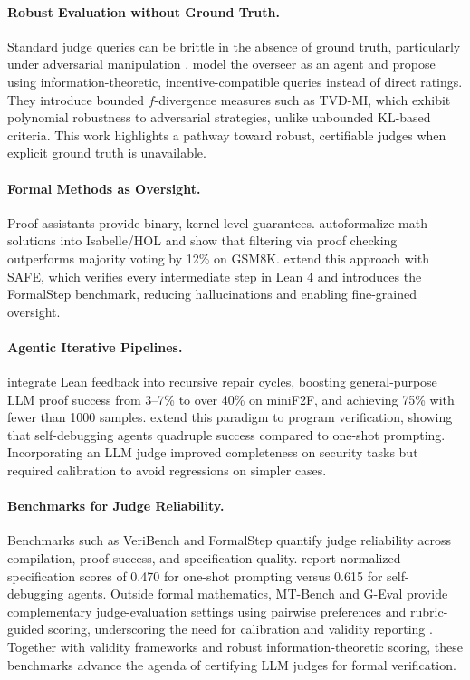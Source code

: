 \documentclass{article}
\begin{document}
\paragraph{Robust Evaluation without Ground Truth.}
Standard judge queries can be brittle in the absence of ground truth, particularly under adversarial manipulation \citep{Zhuo2024ICEScore,TongZhang2024CodeJudge}. \citet{robertson2025stepbystep} model the overseer as an agent and propose using information-theoretic, incentive-compatible queries instead of direct ratings. They introduce bounded $f$-divergence measures such as TVD-MI, which exhibit polynomial robustness to adversarial strategies, unlike unbounded KL-based criteria. This work highlights a pathway toward robust, certifiable judges when explicit ground truth is unavailable.

\paragraph{Formal Methods as Oversight.}
Proof assistants provide binary, kernel-level guarantees. \citet{zhou2024donttrustverify} autoformalize math solutions into Isabelle/HOL and show that filtering via proof checking outperforms majority voting by 12\% on GSM8K. \citet{liu2025safe} extend this approach with SAFE, which verifies every intermediate step in Lean 4 and introduces the FormalStep benchmark, reducing hallucinations and enabling fine-grained oversight.

\paragraph{Agentic Iterative Pipelines.}
\citet{ospanov2023apollo} integrate Lean feedback into recursive repair cycles, boosting general-purpose LLM proof success from 3--7\% to over 40\% on miniF2F, and achieving 75\% with fewer than 1000 samples. \citet{miranda2025veribench} extend this paradigm to program verification, showing that self-debugging agents quadruple success compared to one-shot prompting.
Incorporating an LLM judge improved completeness on security tasks but required calibration to avoid regressions on simpler cases.

\paragraph{Benchmarks for Judge Reliability.}
Benchmarks such as VeriBench and FormalStep quantify judge reliability across compilation, proof success, and specification quality.
\citet{miranda2025veribench} report normalized specification scores of 0.470 for one-shot prompting versus 0.615 for self-debugging agents.
Outside formal mathematics, MT-Bench and G-Eval provide complementary judge-evaluation settings using pairwise preferences and rubric-guided scoring, underscoring the need for calibration and validity reporting \citep{Zheng2023MTBench,Liu2023GEval}.
Together with validity frameworks and robust information-theoretic scoring, these benchmarks advance the agenda of certifying LLM judges for formal verification.
\end{document}
